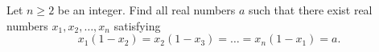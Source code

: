 Let $n \ge 2$ be an integer. Find all real numbers $a$ such that there exist real numbers $x_1,x_2,\dots,x_n$ satisfying
\[x_1(1-x_2)=x_2(1-x_3)=\dots=x_n(1-x_1)=a.\]

